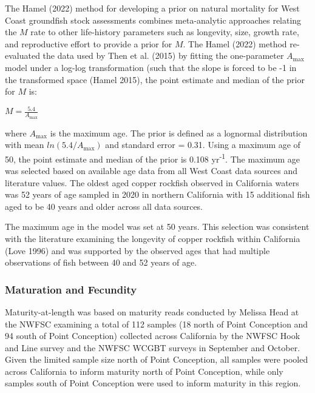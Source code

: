 \documentclass[11pt,
  english,
  letterpaper,
]{article}
\begin{document}
The Hamel (2022) method for developing a prior on natural mortality for West Coast groundfish stock assessments combines meta-analytic approaches relating the \(M\) rate to other life-history parameters such as longevity, size, growth rate, and reproductive effort to provide a prior for \(M\). The Hamel (2022) method re-evaluated the data used by Then et al. (2015) by fitting the one-parameter \(A_{\text{max}}\) model under a log-log transformation (such that the slope is forced to be -1 in the transformed space (Hamel 2015), the point estimate and median of the prior for \(M\) is:

\begin{centering}

$M=\frac{5.4}{A_{\text{max}}}$

\end{centering}

\vspace{0.5cm}

where \(A_{\text{max}}\) is the maximum age. The prior is defined as a lognormal distribution with mean \(ln(5.4/A_{\text{max}})\) and standard error = 0.31. Using a maximum age of 50, the point estimate and median of the prior is 0.108 yr\textsuperscript{-1}. The maximum age was selected based on available age data from all West Coast data sources and literature values. The oldest aged copper rockfish observed in California waters was 52 years of age sampled in 2020 in northern California with 15 additional fish aged to be 40 years and older across all data sources.

The maximum age in the model was set at 50 years. This selection was consistent with the literature examining the longevity of copper rockfish within California (Love 1996) and was supported by the observed ages that had multiple observations of fish between 40 and 52 years of age.

\hypertarget{maturation-and-fecundity}{%
\subsubsection{Maturation and Fecundity}\label{maturation-and-fecundity}}

Maturity-at-length was based on maturity reads conducted by Melissa Head at the NWFSC examining a total of 112 samples (18 north of Point Conception and 94 south of Point Conception) collected across California by the NWFSC Hook and Line survey and the NWFSC WCGBT surveys in September and October. Given the limited sample size north of Point Conception, all samples were pooled across California to inform maturity north of Point Conception, while only samples south of Point Conception were used to inform maturity in this region.
\end{document}
